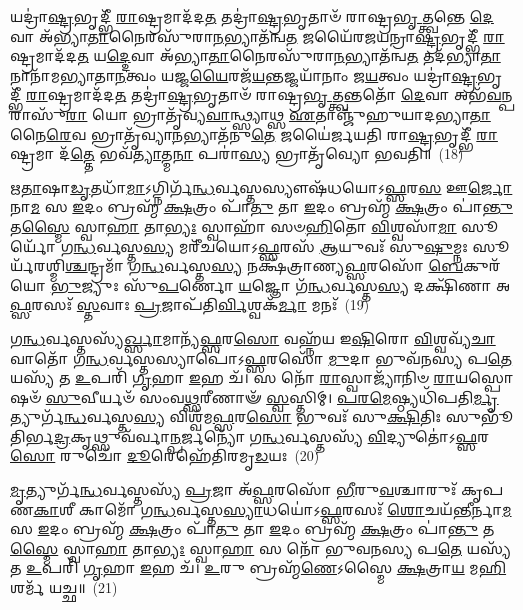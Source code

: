 𑌯𑌦𑍍𑌰𑌾॑\-\ul{𑌷𑍍𑌟𑍍𑌰}\-𑌭𑍃𑌦𑍍𑌭𑍀᳴ \ul{𑌰𑌾}\-𑌷𑍍𑌟𑍍𑌰𑌮𑌾𑌦᳴𑌦\-\ul{𑌤} 𑌤𑌦𑍍𑌰𑌾॑\-\ul{𑌷𑍍𑌟𑍍𑌰}\-𑌭𑍃𑌤𑌾𑍞᳴ 𑌰𑌾𑌷𑍍𑌟𑍍𑌰\-\ul{𑌭𑍃}\-𑌤𑍍𑌤𑍍𑌵𑌨𑍍𑌤𑍇 \ul{𑌦𑍇}\-𑌵𑌾 𑌅᳴𑌭𑍍𑌯𑌾\-\ul{𑌤𑌾}\-𑌨𑍈𑌰𑌸𑍁᳴𑌰𑌾\-\ul{𑌨}\-𑌭𑍍𑌯𑌾𑌤᳴𑌨𑍍𑌵\-\ul{𑌤} 𑌜𑌯𑍈᳴𑌰𑌜𑌯𑌨𑍍𑌰𑌾\-\ul{𑌷𑍍𑌟𑍍𑌰}\-𑌭𑍃𑌦𑍍𑌭𑍀᳴ \ul{𑌰𑌾}\-𑌷𑍍𑌟𑍍𑌰𑌮𑌾𑌦᳴𑌦\-\ul{𑌤} 𑌯\-\ul{𑌦𑍍𑌦𑍇}\-𑌵𑌾 𑌅᳴𑌭𑍍𑌯𑌾\-\ul{𑌤𑌾}\-𑌨𑍈𑌰𑌸𑍁᳴𑌰𑌾\-\ul{𑌨}\-𑌭𑍍𑌯𑌾𑌤᳴𑌨𑍍𑌵\-\ul{𑌤} 𑌤𑌦᳴𑌭𑍍𑌯𑌾\-\ul{𑌤𑌾}\-𑌨𑌾𑌨𑌾᳴𑌮𑌭𑍍𑌯𑌾𑌤𑌾\-\ul{𑌨}\-𑌤𑍍𑌵𑌂 𑌯𑌜𑍍𑌜\-\ul{𑌯𑍈}\-𑌰𑌜᳴\-\ul{𑌯}\-𑌨𑍍𑌤𑌜𑍍𑌜𑌯𑌾᳴𑌨𑌾𑌂 𑌜\-\ul{𑌯}\-𑌤𑍍𑌵𑌂 𑌯𑌦𑍍𑌰𑌾॑\-\ul{𑌷𑍍𑌟𑍍𑌰}\-𑌭𑍃𑌦𑍍𑌭𑍀᳴ \ul{𑌰𑌾}\-𑌷𑍍𑌟𑍍𑌰𑌮𑌾𑌦᳴𑌦\-\ul{𑌤} 𑌤𑌦𑍍𑌰𑌾॑\-\ul{𑌷𑍍𑌟𑍍𑌰}\-𑌭𑍃𑌤𑌾𑍞᳴ 𑌰𑌾𑌷𑍍𑌟𑍍𑌰\-\ul{𑌭𑍃}\-𑌤𑍍𑌤𑍍𑌵𑌨𑍍𑌤𑌤𑍋᳴ \ul{𑌦𑍇}\-𑌵𑌾 𑌅𑌭᳴\-\ul{𑌵}\-𑌨𑍍𑌪𑌰𑌾𑌸𑍁᳴\-\ul{𑌰𑌾} 𑌯𑍋 𑌭𑍍𑌰𑌾𑌤𑍃᳴𑌵𑍍𑌯\-\ul{𑌵𑌾}\-𑌨𑍍𑌥𑍍𑌸𑍍𑌯𑌾𑌥𑍍𑌸 \ul{𑌏}\-𑌤𑌾𑌞𑍍𑌜𑍁᳴𑌹𑍁𑌯𑌾𑌦𑌭𑍍𑌯𑌾\-\ul{𑌤𑌾}\-𑌨𑍈\-\ul{𑌰𑍇}\-𑌵 𑌭𑍍𑌰𑌾𑌤𑍃᳴𑌵𑍍𑌯𑌾\-\ul{𑌨}\-𑌭𑍍𑌯𑌾𑌤᳴𑌨𑍁\-\ul{𑌤𑍇} 𑌜𑌯𑍈॑𑌰𑍍𑌜𑌯𑌤𑌿 𑌰𑌾\-\ul{𑌷𑍍𑌟𑍍𑌰}\-𑌭𑍃𑌦𑍍𑌭𑍀᳴ \ul{𑌰𑌾}\-𑌷𑍍𑌟𑍍𑌰𑌮𑌾 𑌦᳴\-\ul{𑌤𑍍𑌤𑍇} 𑌭𑌵᳴\-\ul{𑌤𑍍𑌯𑌾}\-𑌤𑍍𑌮\-\ul{𑌨𑌾} 𑌪𑌰𑌾॑\-\ul{𑌸𑍍𑌯} 𑌭𑍍𑌰𑌾𑌤𑍃᳴𑌵𑍍𑌯𑍋 𑌭𑌵𑌤𑌿॥~(18)

{\anuvakamend[{\-\ul{𑌪𑍍𑌰𑌾}\-\-\ul{𑌜𑌾}\-\-\ul{𑌪}\-𑌤𑍍𑌯𑌾𑌃 𑌸𑍋॑\-𑌽𑌷𑍍𑌟𑌾𑌦᳴𑌶 𑌚}]}%

\-\ul{𑌋}\-\-\ul{𑌤𑌾}\-𑌷𑌾\-\ul{𑌡𑍃}\-𑌤𑌧𑌾᳴\-\ul{𑌮𑌾}\-\-𑌽𑌗𑍍𑌨𑌿𑌰𑍍𑌗᳴\-\ul{𑌨𑍍𑌧}\-𑌰𑍍𑌵𑌸𑍍𑌤𑌸𑍍𑌯𑍗𑌷᳴𑌧𑌯𑍋\-𑌽\-\ul{𑌫𑍍𑌸}\-𑌰\-\ul{𑌸} 𑌊\-\ul{𑌰𑍍𑌜𑍋} 𑌨𑌾\-\ul{𑌮} 𑌸 \ul{𑌇}\-𑌦𑌂 𑌬𑍍𑌰𑌹𑍍𑌮᳴ \ul{𑌕𑍍𑌷}\-𑌤𑍍𑌰𑌂 𑌪𑌾᳴\-\ul{𑌤𑍁} 𑌤𑌾 \ul{𑌇}\-𑌦𑌂 𑌬𑍍𑌰𑌹𑍍𑌮᳴ \ul{𑌕𑍍𑌷}\-𑌤𑍍𑌰𑌂 𑌪𑌾॑\-\ul{𑌨𑍍𑌤𑍁} 𑌤\-\ul{𑌸𑍍𑌮𑍈} 𑌸𑍍𑌵𑌾\-\ul{𑌹𑌾} 𑌤𑌾\-\ul{𑌭𑍍𑌯𑌃} 𑌸𑍍𑌵𑌾𑌹𑌾᳴ 𑌸𑍞\-\ul{𑌹𑌿}\-𑌤𑍋 \ul{𑌵𑌿}\-𑌶𑍍𑌵𑌸𑌾᳴\-\ul{𑌮𑌾} 𑌸𑍂𑌰𑍍𑌯𑍋᳴ 𑌗\-\ul{𑌨𑍍𑌧}\-𑌰𑍍𑌵𑌸𑍍𑌤\-\ul{𑌸𑍍𑌯} 𑌮𑌰𑍀᳴𑌚𑌯𑍋\-𑌽\-\ul{𑌫𑍍𑌸}\-𑌰𑌸᳴ \ul{𑌆}\-𑌯𑍁𑌵𑌃᳴ 𑌸𑍁\-\ul{𑌷𑍁}\-𑌮𑍍𑌨𑌃 𑌸𑍂𑌰𑍍𑌯᳴𑌰𑌶𑍍𑌮𑌿\-\ul{𑌶𑍍𑌚}\-𑌨𑍍𑌦𑍍𑌰𑌮𑌾᳴ 𑌗\-\ul{𑌨𑍍𑌧}\-𑌰𑍍𑌵𑌸𑍍𑌤\-\ul{𑌸𑍍𑌯} 𑌨𑌕𑍍𑌷᳴𑌤𑍍𑌰𑌾𑌣𑍍𑌯\-\ul{𑌫𑍍𑌸}\-𑌰𑌸𑍋᳴ \ul{𑌬𑍇}\-𑌕𑍁𑌰᳴𑌯𑍋 \ul{𑌭𑍁}\-𑌜𑍍𑌯𑍁𑌃 𑌸𑍁᳴\-\ul{𑌪}\-𑌰𑍍𑌣𑍋 \ul{𑌯}\-𑌜𑍍𑌞𑍋 𑌗᳴\-\ul{𑌨𑍍𑌧}\-𑌰𑍍𑌵𑌸𑍍𑌤\-\ul{𑌸𑍍𑌯} 𑌦𑌕𑍍𑌷𑌿᳴𑌣𑌾 𑌅\-\ul{𑌫𑍍𑌸}\-𑌰𑌸𑌃᳴ \ul{𑌸𑍍𑌤}\-𑌵𑌾𑌃 \ul{𑌪𑍍𑌰}\-𑌜𑌾𑌪᳴𑌤𑌿\-\ul{𑌰𑍍𑌵𑌿}\-𑌶𑍍𑌵𑌕᳴\-\ul{𑌰𑍍𑌮𑌾} 𑌮𑌨𑌃᳴~(19)

\-\ul{𑌗}\-\-\ul{𑌨𑍍𑌧}\-𑌰𑍍𑌵𑌸𑍍𑌤𑌸𑍍𑌯᳴\-\ul{𑌰𑍍𑌖𑍍𑌸𑌾}\-𑌮𑌾𑌨𑍍𑌯᳴\-\ul{𑌫𑍍𑌸}\-𑌰\-\ul{𑌸𑍋} 𑌵𑌹𑍍𑌨᳴𑌯 𑌇\-\ul{𑌷𑌿}\-𑌰𑍋 \ul{𑌵𑌿}\-𑌶𑍍𑌵𑌵𑍍𑌯᳴\-\ul{𑌚𑌾} 𑌵𑌾𑌤𑍋᳴ 𑌗\-\ul{𑌨𑍍𑌧}\-𑌰𑍍𑌵𑌸𑍍𑌤𑌸𑍍𑌯𑌾𑌪𑍋॑\-𑌽\-\ul{𑌫𑍍𑌸}\-𑌰𑌸𑍋᳴ \ul{𑌮𑍁}\-𑌦𑌾 𑌭𑍁𑌵᳴𑌨𑌸𑍍𑌯 𑌪\-\ul{𑌤𑍇} 𑌯𑌸𑍍𑌯᳴ 𑌤 \ul{𑌉}\-𑌪𑌰𑌿᳴ \ul{𑌗𑍃}\-𑌹𑌾 \ul{𑌇}\-𑌹 𑌚᳴। 𑌸 𑌨𑍋᳴ \ul{𑌰𑌾}\-𑌸𑍍𑌵𑌾𑌜𑍍𑌯𑌾᳴𑌨𑌿𑍞 \ul{𑌰𑌾}\-𑌯𑌸𑍍𑌪𑍋𑌷𑍞᳴ \ul{𑌸𑍁}\-𑌵𑍀𑌰𑍍𑌯𑍞᳴ 𑌸𑌂𑌵\-\ul{𑌥𑍍𑌸}\-𑌰𑍀𑌣𑌾𑍟᳴ \ul{𑌸𑍍𑌵}\-𑌸𑍍𑌤𑌿𑌮𑍍। \ul{𑌪}\-\-\ul{𑌰}\-\-\ul{𑌮𑍇}\-𑌷𑍍𑌠𑍍𑌯𑌧𑌿᳴𑌪𑌤𑌿\-\-\ul{𑌰𑍍𑌮𑍃}\-𑌤𑍍𑌯𑍁𑌰𑍍𑌗᳴\-\ul{𑌨𑍍𑌧}\-𑌰𑍍𑌵𑌸𑍍𑌤\-\ul{𑌸𑍍𑌯} 𑌵𑌿𑌶𑍍𑌵᳴𑌮\-\ul{𑌫𑍍𑌸}\-𑌰\-\ul{𑌸𑍋} 𑌭𑍁𑌵𑌃᳴ 𑌸𑍁\-\ul{𑌕𑍍𑌷𑌿}\-𑌤𑌿𑌃 𑌸𑍁𑌭𑍂᳴𑌤𑌿𑌰𑍍𑌭\-\ul{𑌦𑍍𑌰}\-𑌕𑍃𑌥𑍍𑌸𑍁𑌵᳴𑌰𑍍𑌵𑌾\-\ul{𑌨𑍍𑌪}\-𑌰𑍍𑌜𑌨𑍍𑌯𑍋᳴ 𑌗\-\ul{𑌨𑍍𑌧}\-𑌰𑍍𑌵𑌸𑍍𑌤𑌸𑍍𑌯᳴ \ul{𑌵𑌿}\-𑌦𑍍𑌯𑍁𑌤𑍋॑\-𑌽\-\ul{𑌫𑍍𑌸}\-𑌰\-\ul{𑌸𑍋} 𑌰𑍁𑌚𑍋᳴ \ul{𑌦𑍂}\-𑌰𑍇𑌹𑍇᳴𑌤𑌿𑌰𑌮𑍃\-\ul{𑌡}\-𑌯𑌃~(20)

\-\ul{𑌮𑍃}\-𑌤𑍍𑌯𑍁𑌰𑍍𑌗᳴\-\ul{𑌨𑍍𑌧}\-𑌰𑍍𑌵𑌸𑍍𑌤𑌸𑍍𑌯᳴ \ul{𑌪𑍍𑌰}\-𑌜𑌾 𑌅᳴\-\ul{𑌫𑍍𑌸}\-𑌰𑌸𑍋᳴ \ul{𑌭𑍀}\-𑌰𑍁\-\ul{𑌵}\-𑌶𑍍𑌚𑌾𑌰𑍁𑌃᳴ 𑌕𑍃𑌪𑌣\-\ul{𑌕𑌾}\-𑌶𑍀 𑌕𑌾𑌮𑍋᳴ 𑌗\-\ul{𑌨𑍍𑌧}\-𑌰𑍍𑌵𑌸𑍍𑌤\-\ul{𑌸𑍍𑌯𑌾}\-𑌧𑌯𑍋॑\-𑌽\-\ul{𑌫𑍍𑌸}\-𑌰𑌸𑌃᳴ \ul{𑌶𑍋}\-𑌚𑌯᳴\-\ul{𑌨𑍍𑌤𑍀}\-𑌰𑍍𑌨𑌾\-\ul{𑌮} 𑌸 \ul{𑌇}\-𑌦𑌂 𑌬𑍍𑌰𑌹𑍍𑌮᳴ \ul{𑌕𑍍𑌷}\-𑌤𑍍𑌰𑌂 𑌪𑌾᳴\-\ul{𑌤𑍁} 𑌤𑌾 \ul{𑌇}\-𑌦𑌂 𑌬𑍍𑌰𑌹𑍍𑌮᳴ \ul{𑌕𑍍𑌷}\-𑌤𑍍𑌰𑌂 𑌪𑌾॑\-\ul{𑌨𑍍𑌤𑍁} 𑌤\-\ul{𑌸𑍍𑌮𑍈} 𑌸𑍍𑌵𑌾\-\ul{𑌹𑌾} 𑌤𑌾\-\ul{𑌭𑍍𑌯𑌃} 𑌸𑍍𑌵𑌾\-\ul{𑌹𑌾} 𑌸 𑌨𑍋᳴ 𑌭𑍁𑌵𑌨𑌸𑍍𑌯 𑌪\-\ul{𑌤𑍇} 𑌯𑌸𑍍𑌯᳴ 𑌤 \ul{𑌉}\-𑌪𑌰𑌿᳴ \ul{𑌗𑍃}\-𑌹𑌾 \ul{𑌇}\-𑌹 𑌚᳴। \ul{𑌉}\-𑌰𑍁 𑌬𑍍𑌰𑌹𑍍𑌮᳴\-\ul{𑌣𑍇}\-\-𑌽𑌸𑍍𑌮𑍈 \ul{𑌕𑍍𑌷}\-𑌤𑍍𑌰𑌾\-\ul{𑌯} 𑌮\-\ul{𑌹𑌿} 𑌶𑌰𑍍𑌮᳴ 𑌯𑌚𑍍𑌛॥~(21)

